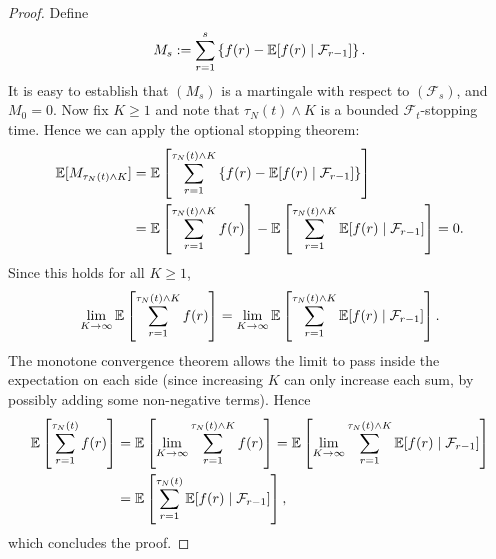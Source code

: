 \begin{proof}
Define 
\begin{equation*}
M_s 
:= \sum_{r=1}^s \left\{ f(r) - \mathbb{E} [ f(r) \mid \mathcal{F}_{r-1} ] \right\} .
\end{equation*}
It is easy to establish that $(M_s)$ is a martingale with respect to $(\mathcal{F}_s)$, and $M_0 = 0$. 
Now fix $K\geq 1$ and note that $\tau_N(t) \wedge K$ is a bounded $\mathcal{F}_t$-stopping time.
Hence we can apply the optional stopping theorem:
\begin{align*}
\mathbb{E} [M_{\tau_N(t) \wedge K} ]
&= \mathbb{E} \left[ \sum_{r=1}^{\tau_N(t) \wedge K} \left\{ f(r) 
        - \mathbb{E} [ f(r) \mid \mathcal{F}_{r-1} ] \right\} \right] \\
&= \mathbb{E} \left[ \sum_{r=1}^{\tau_N(t) \wedge K} f(r) \right]
        - \mathbb{E} \left[ \sum_{r=1}^{\tau_N(t) \wedge K} 
        \mathbb{E} [ f(r) \mid \mathcal{F}_{r-1} ] \right]
=0 .
\end{align*}
Since this holds for all $K\geq 1$,
\begin{equation*}
\lim_{K\to\infty} \mathbb{E} \left[ \sum_{r=1}^{\tau_N(t) \wedge K} f(r) \right]
= \lim_{K\to\infty} \mathbb{E} \left[ \sum_{r=1}^{\tau_N(t) \wedge K} 
        \mathbb{E} [ f(r) \mid \mathcal{F}_{r-1} ] \right] .
\end{equation*}
The monotone convergence theorem allows the limit to pass inside the expectation on each side (since increasing $K$ can only increase each sum, by possibly adding some non-negative terms). Hence
\begin{align*}
\mathbb{E} \left[ \sum_{r=1}^{\tau_N(t)} f(r) \right]
&= \mathbb{E} \left[ \lim_{K\to\infty} \sum_{r=1}^{\tau_N(t) \wedge K} f(r) \right]
= \mathbb{E} \left[ \lim_{K\to\infty} \sum_{r=1}^{\tau_N(t) \wedge K} 
        \mathbb{E} [ f(r) \mid \mathcal{F}_{r-1} ] \right] \\
&= \mathbb{E} \left[ \sum_{r=1}^{\tau_N(t)} 
        \mathbb{E} [ f(r) \mid \mathcal{F}_{r-1} ] \right] ,
\end{align*}
which concludes the proof.
\end{proof}



